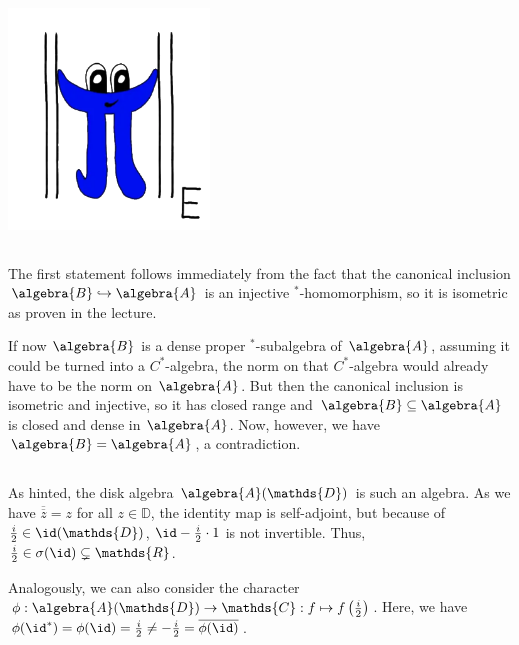 \documentclass[a4paper]{article}
\begin{document}
\makeexheader

\begin{center}
    \includegraphics*[width=0.4\textwidth]{pi.png}
\end{center}

\subsection{}

The first statement follows immediately from the fact that the canonical inclusion $\algebra{B} \hookrightarrow \algebra{A}$ is an injective $^*$-homomorphism, so it is isometric as proven in the lecture.

If now $\algebra{B}$ is a dense proper $^*$-subalgebra of $\algebra{A}$, assuming it could be turned into a $C^*$-algebra, the norm on that $C^*$-algebra would already have to be the norm on $\algebra{A}$.
But then the canonical inclusion is isometric and injective, so it has closed range and $\algebra{B} \subseteq \algebra{A}$ is closed and dense in $\algebra{A}$.
Now, however, we have $\algebra{B} = \algebra{A}$, a contradiction.

\subsection{}

As hinted, the disk algebra $\algebra{A}(\mathds{D})$ is such an algebra.
As we have $\overline{\overline{z}} = z$ for all $z \in \mathds{D}$, the identity map is self-adjoint, but because of $\frac{i}{2} \in \id(\mathds{D})$, $\id - \frac{i}{2} \cdot 1$ is not invertible.
Thus, $\frac{i}{2} \in \sigma(\id) \subsetneq \mathds{R}$.

Analogously, we can also consider the character $\phi: \algebra{A}(\mathds{D}) \to \mathds{C}: f \mapsto f\left(\frac{i}{2}\right)$.
Here, we have $\phi(\id^*) = \phi(\id) = \frac{i}{2} \neq - \frac{i}{2} = \overline{\phi(\id)}$.
\end{document}
